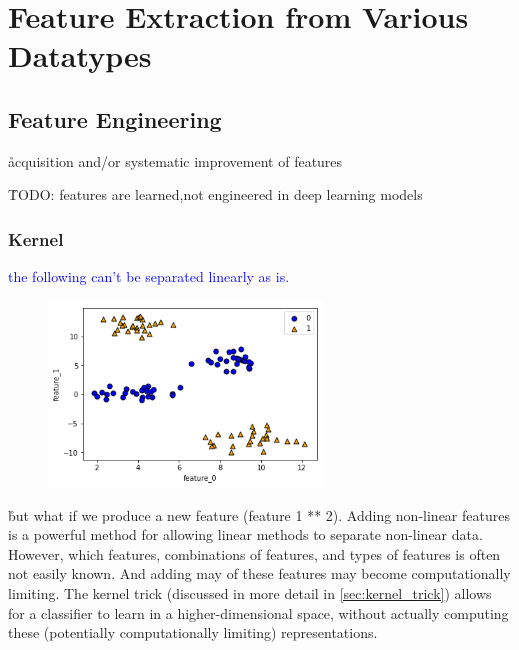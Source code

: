 \section{Feature Extraction from Various Datatypes}


\subsection{Feature Engineering}

\r{acquisition and/or systematic improvement of features}

\r{TODO: features are learned,not engineered in deep learning models}

\subsubsection{Kernel}

\textcolor{blue}{the following can't be separated linearly as is.}

\begin{figure}
\centering
\includegraphics[width=0.65\textwidth]{./sync_imgs/kernelized/2class4clust/2dimg.png}
\label{fig:kernelized_2class4clust_2dimg}
\end{figure}

\r{but what if we produce a new feature (feature 1 ** 2). Adding non-linear features is a powerful method for allowing linear methods to separate non-linear data. However, which features, combinations of features, and types of features is often not easily known. And adding may of these features may become computationally limiting. The {kernel trick} (discussed in more detail in \ref{sec:kernel_trick}) allows for a classifier to learn in a higher-dimensional space, without actually computing these (potentially computationally limiting) representations.}

